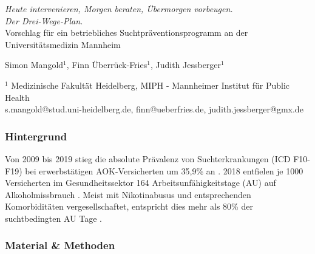 \documentclass[a4paper]{article}
\begin{document}


\Large
 \begin{center}
   \textit{Heute intervenieren, Morgen beraten, Übermorgen vorbeugen. \\ Der Drei-Wege-Plan.} \\ Vorschlag für ein betriebliches Suchtpräventionsprogramm an der Universitätsmedizin Mannheim \\
\hspace{10pt}

\large
Simon Mangold$^1$, Finn Überrück-Fries$^1$, Judith Jessberger$^1$ \\

\hspace{10pt}

\small 
$^1$ Medizinische Fakultät Heidelberg, MIPH - Mannheimer Institut für Public Health\\
s.mangold@stud.uni-heidelberg.de, finn@ueberfries.de, judith.jessberger@gmx.de\\

\end{center}


\normalsize
\subsubsection*{Hintergrund}%
Von 2009 bis 2019 stieg die absolute Prävalenz von Suchterkrankungen (ICD F10-F19) bei erwerbstätigen AOK-Versicherten um 35,9\% an . 2018 entfielen je 1000 Versicherten im Gesundheitssektor 164 Arbeitsunfähigkeitstage (AU) auf Alkoholmissbrauch . Meist mit Nikotinabusus und entsprechenden Komorbiditäten vergesellschaftet, entspricht dies mehr als 80\% der suchtbedingten AU Tage .  



\subsubsection*{Material \& Methoden}
\end{document}

